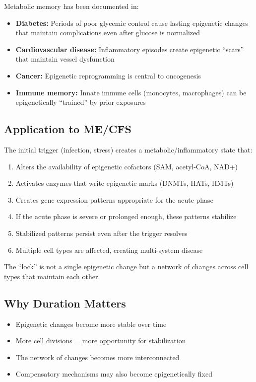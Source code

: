 Metabolic memory has been documented in:
\begin{itemize}
    \item \textbf{Diabetes:} Periods of poor glycemic control cause lasting epigenetic changes that maintain complications even after glucose is normalized
    \item \textbf{Cardiovascular disease:} Inflammatory episodes create epigenetic ``scars'' that maintain vessel dysfunction
    \item \textbf{Cancer:} Epigenetic reprogramming is central to oncogenesis
    \item \textbf{Immune memory:} Innate immune cells (monocytes, macrophages) can be epigenetically ``trained'' by prior exposures
\end{itemize}

\subsection{Application to ME/CFS}

The initial trigger (infection, stress) creates a metabolic/inflammatory state that:

\begin{enumerate}
    \item Alters the availability of epigenetic cofactors (SAM, acetyl-CoA, NAD+)
    \item Activates enzymes that write epigenetic marks (DNMTs, HATs, HMTs)
    \item Creates gene expression patterns appropriate for the acute phase
    \item If the acute phase is severe or prolonged enough, these patterns stabilize
    \item Stabilized patterns persist even after the trigger resolves
    \item Multiple cell types are affected, creating multi-system disease
\end{enumerate}

The ``lock'' is not a single epigenetic change but a network of changes across cell types that maintain each other.

\subsection{Why Duration Matters}

\begin{itemize}
    \item Epigenetic changes become more stable over time
    \item More cell divisions = more opportunity for stabilization
    \item The network of changes becomes more interconnected
    \item Compensatory mechanisms may also become epigenetically fixed
\end{itemize}

